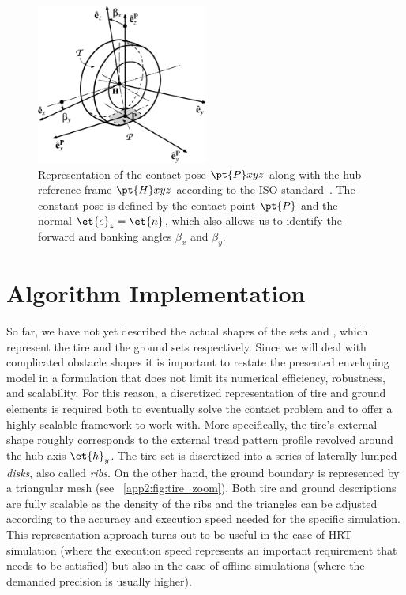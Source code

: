 \begin{figure}[htb]
  \centering
  \includegraphics[width=0.5\textwidth]{./figures/appendix_2/tire_iso}
  \caption{Representation of the contact pose $\pt{P}xyz$ along with the hub reference frame $\pt{H}xyz$ according to the ISO standard~\cite{iso88552011}. The constant pose is defined by the contact point $\pt{P}$ and the normal $\et{e}_z = \et{n}$, which also allows us to identify the forward and banking angles $\beta_x$ and $\beta_y$.}
  \label{app2:fig:tire_iso}
\end{figure}


\section{Algorithm Implementation}
\label{app2:sec:algorithm_implementation}

So far, we have not yet described the actual shapes of the sets  and , which represent the tire and the ground sets respectively. Since we will deal with complicated obstacle shapes it is important to restate the presented enveloping model in a formulation that does not limit its numerical efficiency, robustness, and scalability. For this reason, a discretized representation of tire and ground elements is required both to eventually solve the contact problem and to offer a highly scalable framework to work with. More specifically, the tire's external shape roughly corresponds to the external tread pattern profile revolved around the hub axis $\et{h}_y$. The tire set is discretized into a series of laterally lumped \emph{disks}, also called \emph{ribs}. On the other hand, the ground boundary is represented by a triangular mesh (see \figurename{}~\ref{app2:fig:tire_zoom}). Both tire and ground descriptions are fully scalable as the density of the ribs and the triangles can be adjusted according to the accuracy and execution speed needed for the specific simulation. This representation approach turns out to be useful in the case of \ac{HRT} simulation (where the execution speed represents an important requirement that needs to be satisfied) but also in the case of offline simulations (where the demanded precision is usually higher).

